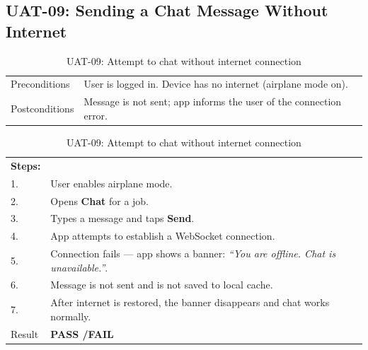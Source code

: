 \subsection*{UAT-09: Sending a Chat Message Without Internet}
\begin{table}[H]
  \centering
  \begin{tabularx}{\textwidth}{lX}
    \toprule
    Preconditions  & User is logged in. Device has no internet (airplane mode on). \\
    Postconditions & Message is not sent; app informs the user of the connection error. \\
    \midrule
  \end{tabularx}
  \begin{tabularx}{\textwidth}{lX}
    \textbf{Steps:} & \\
    1. & User enables airplane mode. \\
    2. & Opens \textbf{Chat} for a job. \\
    3. & Types a message and taps \textbf{Send}. \\
    4. & App attempts to establish a WebSocket connection. \\
    5. & Connection fails --- app shows a banner: \textit{``You are offline. Chat is unavailable.''}. \\
    6. & Message is not sent and is not saved to local cache. \\
    7. & After internet is restored, the banner disappears and chat works normally. \\
    \midrule
    Result & \textbf{PASS \quad/\quad FAIL} \\
    \bottomrule
  \end{tabularx}
  \caption{UAT-09: Attempt to chat without internet connection}
\end{table}

